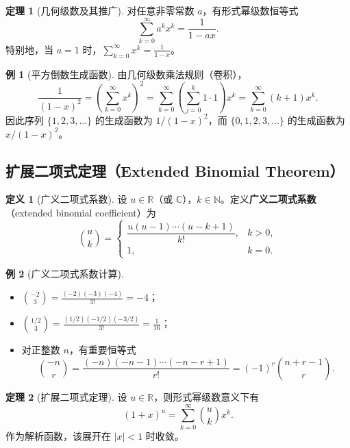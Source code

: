 \documentclass[UTF8,11pt,a4paper]{ctexbook}   %
\theoremstyle{definition}
\newtheorem{definition}{定义}[section]
\newtheorem{theorem}{定理}[section]
\newtheorem{example}{例}[section]
\begin{document}
\begin{theorem}[几何级数及其推广]
对任意非零常数 $a$，有形式幂级数恒等式
\[
\sum_{k=0}^{\infty}a^k x^k=\frac{1}{1-ax}.
\]
特别地，当 $a=1$ 时，$\displaystyle\sum_{k=0}^{\infty}x^k=\frac{1}{1-x}$。
\end{theorem}

\begin{example}[平方倒数生成函数]
由几何级数乘法规则（卷积），
\[
\frac{1}{(1-x)^2}=\left(\sum_{k=0}^{\infty}x^k\right)^2=\sum_{k=0}^{\infty}\left(\sum_{j=0}^{k}1\cdot 1\right)x^k=\sum_{k=0}^{\infty}(k+1)x^k.
\]
因此序列 $\{1,2,3,\dots\}$ 的生成函数为 $1/(1-x)^2$，而 $\{0,1,2,3,\dots\}$ 的生成函数为 $x/(1-x)^2$。
\end{example}

\subsection{扩展二项式定理（Extended Binomial Theorem）}

\begin{definition}[广义二项式系数]
设 $u\in\mathbb{R}$（或 $\mathbb{C}$），$k\in\mathbb{N}$。定义\textbf{广义二项式系数}（extended binomial coefficient）为
\[
\binom{u}{k}=
\begin{cases}
\dfrac{u(u-1)\cdots(u-k+1)}{k!}, & k>0,\\[0.8em]
1, & k=0.
\end{cases}
\]
\end{definition}

\begin{example}[广义二项式系数计算]
\begin{itemize}
    \item $\displaystyle\binom{-2}{3}=\frac{(-2)(-3)(-4)}{3!}=-4$；
    \item $\displaystyle\binom{1/2}{3}=\frac{(1/2)(-1/2)(-3/2)}{3!}=\frac{1}{16}$；
    \item 对正整数 $n$，有重要恒等式
    \[
    \binom{-n}{r}=\frac{(-n)(-n-1)\cdots(-n-r+1)}{r!}=(-1)^r\binom{n+r-1}{r}.
    \]
\end{itemize}
\end{example}

\begin{theorem}[扩展二项式定理]\label{thm:extended-binomial}
设 $u\in\mathbb{R}$，则形式幂级数意义下有
\[
(1+x)^u=\sum_{k=0}^{\infty}\binom{u}{k}x^k.
\]
作为解析函数，该展开在 $|x|<1$ 时收敛。
\end{theorem}
\end{document}
